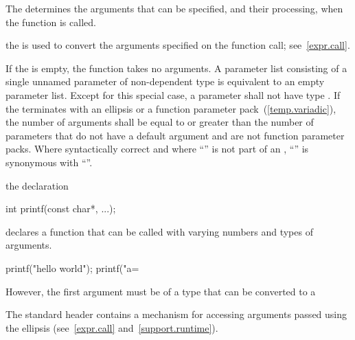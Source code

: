 \pnum
{}%
The
determines the arguments that can be specified, and their processing, when the function is called.
\begin{note}
%
the
is used to convert the arguments specified on the function call;
see~\ref{expr.call}.
\end{note}
%
If the
is empty, the function takes no arguments.
A parameter list consisting of a single unnamed parameter of
non-dependent type  is equivalent to an empty parameter
list.
%
Except for this special case, a parameter shall not have type 
.
If the
%
%
%
%
%
terminates with an ellipsis or a function parameter
pack~(\ref{temp.variadic}), the number of arguments shall be equal
to or greater than the number of parameters that do not have a default
argument and are not function parameter packs.
Where syntactically correct and where ``'' is not
part of an ,
``''
is synonymous with
``''.
\begin{example}
%
%
the declaration

\begin{codeblock}
int printf(const char*, ...);
\end{codeblock}

declares a function that can be called with varying numbers and types of arguments.

\begin{codeblock}
printf("hello world");
printf("a=%
\end{codeblock}

However, the first argument must be of a type
that can be converted to a
\end{example}
\begin{note}
The standard header
%
contains a mechanism for accessing arguments passed using the ellipsis
(see~\ref{expr.call} and~\ref{support.runtime}).
\end{note}

